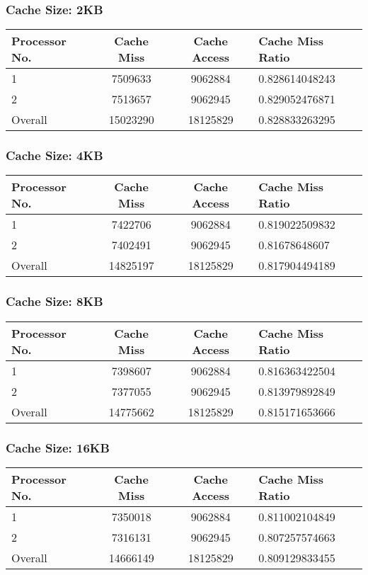 \documentclass[]{article}
\begin{document}
\subsubsection{Cache Size: 2KB}
\begin{tabularx}{\textwidth}{ | l | c | c | X | }
\hline
Processor No.    & Cache Miss    & Cache Access  &   Cache Miss Ratio \\
\hline
1    & 7509633  & 9062884    & 0.828614048243 \\
\hline
2    & 7513657  & 9062945    & 0.829052476871 \\
\hline
Overall & 15023290    & 18125829  & 0.828833263295 \\
\hline
\end{tabularx}


\subsubsection{Cache Size: 4KB}
\begin{tabularx}{\textwidth}{ | l | c | c | X | }
\hline
Processor No.    & Cache Miss    & Cache Access  &   Cache Miss Ratio \\
\hline
1    & 7422706  & 9062884    & 0.819022509832 \\
\hline
2    & 7402491  & 9062945    & 0.81678648607 \\
\hline
Overall & 14825197    & 18125829  & 0.817904494189 \\
\hline
\end{tabularx}


\subsubsection{Cache Size: 8KB}
\begin{tabularx}{\textwidth}{ | l | c | c | X | }
\hline
Processor No.    & Cache Miss    & Cache Access  &   Cache Miss Ratio \\
\hline
1    & 7398607  & 9062884    & 0.816363422504 \\
\hline
2    & 7377055  & 9062945    & 0.813979892849 \\
\hline
Overall & 14775662    & 18125829  & 0.815171653666 \\
\hline
\end{tabularx}


\subsubsection{Cache Size: 16KB}
\begin{tabularx}{\textwidth}{ | l | c | c | X | }
\hline
Processor No.    & Cache Miss    & Cache Access  &   Cache Miss Ratio \\
\hline
1    & 7350018  & 9062884    & 0.811002104849 \\
\hline
2    & 7316131  & 9062945    & 0.807257574663 \\
\hline
Overall & 14666149    & 18125829  & 0.809129833455 \\
\hline
\end{tabularx}
\end{document}
